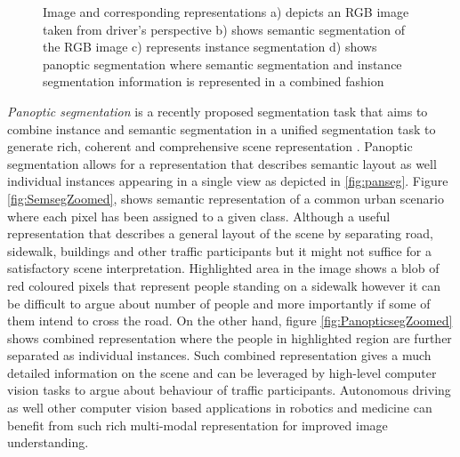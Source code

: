 \begin{figure}[!ht]
{        \label{fig:instseg}}
    \caption[Image Segmentation approaches] {Image and corresponding representations a) depicts an RGB image taken from driver's perspective b) shows semantic segmentation of the RGB image c) represents instance segmentation d) shows panoptic segmentation where semantic segmentation and instance segmentation information is represented in a combined fashion \cite{Cordts2015}}
    \label{fig:Rgbseminstseg}
\end{figure}

\textit {Panoptic segmentation} is a recently proposed segmentation task that aims to combine instance and semantic segmentation in a unified segmentation task to generate rich, coherent and comprehensive scene representation \cite{Kirillov2019}. Panoptic segmentation allows for a representation that describes semantic layout as well individual instances appearing in a single view as depicted in \ref{fig:panseg}. Figure \ref{fig:SemsegZoomed}, shows semantic representation of a common urban scenario where each pixel has been assigned to a given class. Although a useful representation that describes a general layout of the scene by separating road, sidewalk, buildings and other traffic participants but it might not suffice for a satisfactory scene interpretation. Highlighted area in the image shows a blob of red coloured pixels that represent people standing on a sidewalk however it can be difficult to argue about number of people and more importantly if some of them intend to cross the road. On the other hand, figure \ref{fig:PanopticsegZoomed} shows combined representation where the people in highlighted region are further separated as individual instances. Such combined representation gives a much detailed information on the scene and can be leveraged by high-level computer vision tasks to argue about behaviour of traffic participants. Autonomous driving as well other computer vision based applications in robotics and medicine can benefit from such rich multi-modal representation for improved image understanding.

